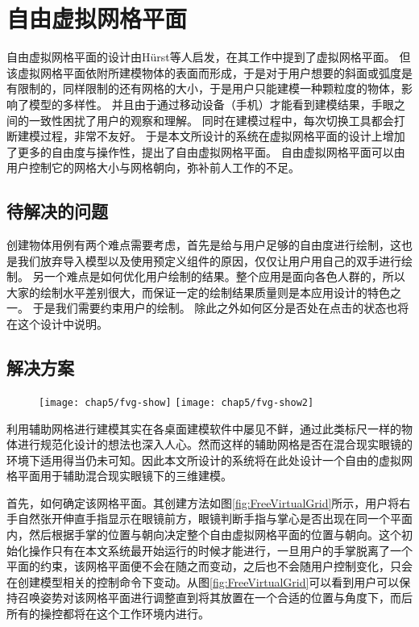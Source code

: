 \section{自由虚拟网格平面}

自由虚拟网格平面的设计由H{\"u}rst等人启发，在其工作中提到了虚拟网格平面。
但该虚拟网格平面依附所建模物体的表面而形成，于是对于用户想要的斜面或弧度是有限制的，同样限制的还有网格的大小，于是用户只能建模一种颗粒度的物体，影响了模型的多样性。
并且由于通过移动设备（手机）才能看到建模结果，手眼之间的一致性困扰了用户的观察和理解。
同时在建模过程中，每次切换工具都会打断建模过程，非常不友好。
于是本文所设计的系统在虚拟网格平面的设计上增加了更多的自由度与操作性，提出了自由虚拟网格平面。
自由虚拟网格平面可以由用户控制它的网格大小与网格朝向，弥补前人工作的不足。

\subsection{待解决的问题}

创建物体用例有两个难点需要考虑，首先是给与用户足够的自由度进行绘制，这也是我们放弃导入模型以及使用预定义组件的原因，仅仅让用户用自己的双手进行绘制。
另一个难点是如何优化用户绘制的结果。整个应用是面向各色人群的，所以大家的绘制水平差别很大，而保证一定的绘制结果质量则是本应用设计的特色之一。
于是我们需要约束用户的绘制。
除此之外如何区分是否处在点击的状态也将在这个设计中说明。

\subsection{解决方案}

\begin{figure}[!htp]
  \centering
  \texttt{[image: chap5/fvg-show]}
  \hspace{1em}
  \texttt{[image: chap5/fvg-show2]}
\end{figure}

利用辅助网格进行建模其实在各桌面建模软件中屡见不鲜，通过此类标尺一样的物体进行规范化设计的想法也深入人心。然而这样的辅助网格是否在混合现实眼镜的环境下适用得当仍未可知。因此本文所设计的系统将在此处设计一个自由的虚拟网格平面用于辅助混合现实眼镜下的三维建模。

首先，如何确定该网格平面。其创建方法如图\ref{fig:FreeVirtualGrid}所示，用户将右手自然张开伸直手指显示在眼镜前方，眼镜判断手指与掌心是否出现在同一个平面内，然后根据手掌的位置与朝向决定整个自由虚拟网格平面的位置与朝向。这个初始化操作只有在本文系统最开始运行的时候才能进行，一旦用户的手掌脱离了一个平面的约束，该网格平面便不会在随之而变动，之后也不会随用户控制变化，只会在创建模型相关的控制命令下变动。从图\ref{fig:FreeVirtualGrid}可以看到用户可以保持召唤姿势对该网格平面进行调整直到将其放置在一个合适的位置与角度下，而后所有的操控都将在这个工作环境内进行。

